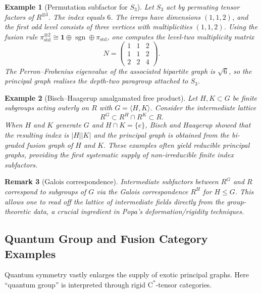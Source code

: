 \documentclass[11pt, a4paper]{article}
\theoremstyle{colored_def}
\theoremstyle{colored_thm}
\theoremstyle{colored_ex}
\newtheorem{example}{Example}[section]
\newtheorem{remark}[example]{Remark}
\begin{document}
\begin{example}[Permutation subfactor for $S_3$]\label{ex:s3}
Let $S_3$ act by permuting tensor factors of $R^{\otimes 3}$. The index equals $6$. The irreps have dimensions $(1,1,2)$, and the first odd level consists of three vertices with multiplicities $(1,1,2)$. Using the fusion rule $\pi_{\mathrm{std}}^{\otimes 2} \cong \mathbf{1} \oplus \operatorname{sgn} \oplus \pi_{\mathrm{std}}$, one computes the level-two multiplicity matrix
\[
    N = \begin{pmatrix}
    1 & 1 & 2 \\
    1 & 1 & 2 \\
    2 & 2 & 4
    \end{pmatrix}.
\]
The Perron--Frobenius eigenvalue of the associated bipartite graph is $\sqrt{6}$, so the principal graph realises the depth-two paragroup attached to $S_3$.
\end{example}

\begin{example}[Bisch--Haagerup amalgamated free product]\label{ex:bisch-haagerup}
Let $H,K \subset G$ be finite subgroups acting outerly on $R$ with $G = \langle H, K \rangle$. Consider the intermediate lattice
\[
    R^G \subset R^H \cap R^K \subset R.
\]
When $H$ and $K$ generate $G$ and $H \cap K = \{e\}$, Bisch and Haagerup showed that the resulting index is $|H||K|$ and the principal graph is obtained from the bi-graded fusion graph of $H$ and $K$. These examples often yield reducible principal graphs, providing the first systematic supply of non-irreducible finite index subfactors.
\end{example}

\begin{remark}[Galois correspondence]
Intermediate subfactors between $R^G$ and $R$ correspond to subgroups of $G$ via the Galois correspondence $R^H$ for $H \leq G$. This allows one to read off the lattice of intermediate fields directly from the group-theoretic data, a crucial ingredient in Popa's deformation/rigidity techniques.
\end{remark}

\subsection{Quantum Group and Fusion Category Examples}\label{subsec:quantum}

Quantum symmetry vastly enlarges the supply of exotic principal graphs. Here ``quantum group'' is interpreted through rigid $\mathrm{C}^*$-tensor categories.
\end{document}
